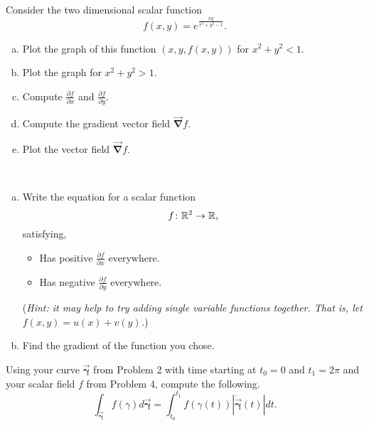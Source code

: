 \documentclass[12pt]{article} %
\newcommand{\curvegamma}{\boldsymbol{\vec{\gamma}}}
\newcommand{\tangentgamma}{\boldsymbol{\dot{\vec{\gamma}}}}
\newcommand{\grad}{\boldsymbol{\vec{\nabla}}}
\begin{document}
\begin{problem} Consider the two dimensional scalar function 
\[
f(x,y)=e^{\frac{xy}{x^2+y^2-1}}.
\]  
    \begin{enumerate}[(a)]
        \item Plot the graph of this function $(x,y,f(x,y))$ for $x^2+y^2<1$.  
        \item Plot the graph for $x^2+y^2>1$.  
        \item Compute $\frac{\partial f}{\partial x}$ and $\frac{\partial f}{\partial y}$.
        \item Compute the gradient vector field $\grad f$.  
        \item Plot the vector field $\grad f$. 
    \end{enumerate}
\end{problem}

\begin{problem}~
\begin{enumerate}[(a)]

\item    Write the equation for a scalar function 
    \[
    f\colon \mathbb{R}^2 \to \mathbb{R},
    \]
    satisfying,
    \begin{itemize}
        \item Has positive $\frac{\partial f}{\partial x}$ everywhere.  
        \item Has negative $\frac{\partial f}{\partial y}$ everywhere.  
    \end{itemize}
    (\emph{Hint: it may help to try adding single variable functions together. That is, let $f(x,y)=u(x)+v(y)$.})
    \item Find the gradient of the function you chose.
\end{enumerate}
\end{problem}

\begin{problem}
    Using your curve $\curvegamma$ from Problem 2 with time starting at $t_0=0$ and $t_1=2\pi$ and your scalar field $f$ from Problem 4, compute the following. 
    \[
    \int_{\curvegamma} f(\gamma)d\curvegamma = \int_{t_0}^{t_1} f(\gamma(t))\left|\tangentgamma(t)\right|dt.
    \]
\end{problem}
\end{document}
